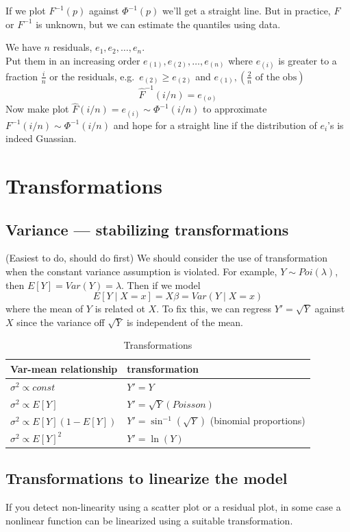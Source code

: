 \documentclass[12 pt]{article}
\begin{document}
\begin{enumerate}
\begin{itemize}
If we plot $F^{-1}(p)$ against $\Phi^{-1}(p)$ we'll get a straight
line. But in practice, $F$ or $F^{-1}$ is unknown, but we can estimate
the quantiles using data.

We have $n$ residuals, $e_1, e_2, \ldots, e_n$.
\\ Put them in an increasing order $e_{(1)}, e_{(2)}, \ldots, e_{(n)}$
where $e_{(i)}$ is greater to a fraction $\frac{i}{n}$ or the
residuals, e.g.\ $e_{(2)} \geq e_{(2)}$ and $e_{(1)},
\left(\frac{2}{n} \text{ of the obs}\right)$
$$\hat{F}^{-1}(i/n) = e_{(o)}$$
Now make  plot $\hat{F}(i/n) = e_{(i)} \sim \Phi^{-1}(i/n)$ to
approximate $F^{-1}(i/n) \sim \Phi^{-1}(i/n)$ and hope for a straight
line if the distribution of $e_i$'s is indeed Guassian.
\end{itemize}
\end{enumerate}
\section{Transformations}
\subsection{Variance --- stabilizing transformations}
(Easiest to do, should do first) We should consider the use of transformation when the constant
variance assumption is violated. For example, $Y \sim Poi(\lambda)$,
then $E[Y] = Var(Y) = \lambda$. Then if we model
$$E[Y \mid X = x] = X \beta = Var(Y \mid X = x)$$ where the mean of
$Y$ is related ot $X$. To fix this, we can regress $Y'=\sqrt{Y}$
against $X$ since the variance off $\sqrt{Y}$ is independent of the
mean.
\begin{table}[H]
  \centering
  \begin{tabular}{l l}
    Var-mean relationship & transformation
    \\ \hline$\sigma^2 \propto const$& $Y'=Y$
    \\ $\sigma^2 \propto E[Y]$ & $Y'=\sqrt{Y} (Poisson)$
    \\ $\sigma^2 \propto E[Y](1-E[Y])$ & $Y' = \sin^{-1}(\sqrt{Y})$ (binomial proportions)
    \\ $\sigma^2 \propto E[Y]^2$ & $Y'=\ln (Y)$
  \end{tabular}
  \caption{Transformations}
\end{table}
\subsection{Transformations to linearize the model}
If you detect non-linearity using a scatter plot or a residual plot,
in some case a nonlinear function can be linearized using a suitable
transformation.
\end{document}
